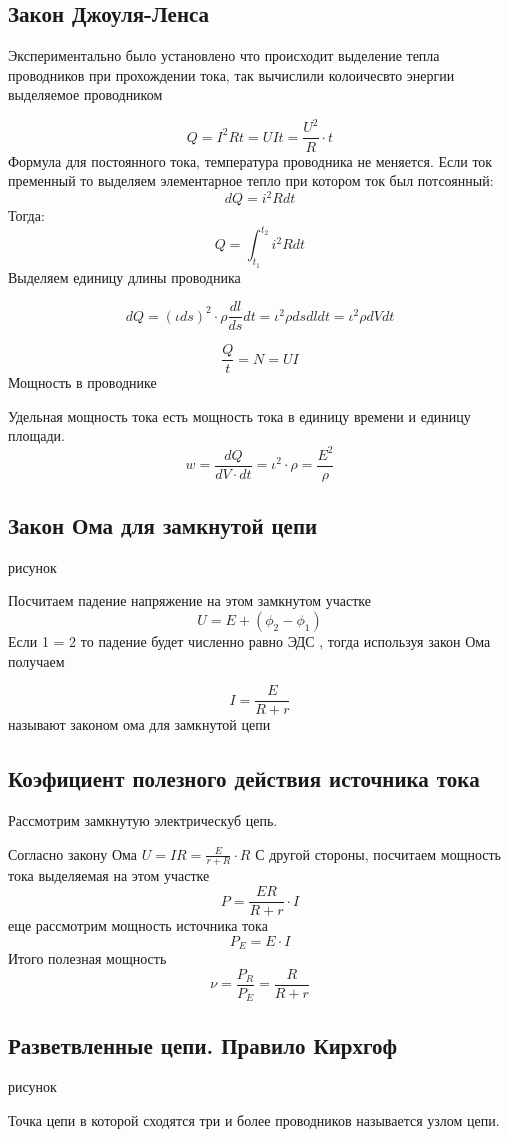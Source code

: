 \documentclass[../main.tex]{subfiles}
\begin{document}
\subsection{Закон Джоуля-Ленса}
Экспериментально было установлено что происходит  выделение тепла проводников при прохождении тока, так вычислили колоичесвто энергии выделяемое проводником

\[ Q = I^2 R t = UIt = \frac{U^2}{R} \cdot t\]
Формула для постоянного тока, температура проводника не меняется. Если ток пременный то выделяем элементарное тепло при котором ток был потсоянный:
\[dQ = i^2 R dt\]
Тогда:
\[Q = \int_{t_1}^{t_2} i^2 R dt\]
Выделяем единицу длины проводника

\[dQ = (\iota ds)^2 \cdot \rho \frac{dl}{ds} dt  = \iota^2 \rho ds dl dt =\iota^2 \rho dV dt \]

\[\frac{Q}{t} = N = UI\]
Мощность в проводнике

Удельная мощность тока есть мощность тока в единицу времени и единицу площади.
\[w = \frac{dQ}{dV \cdot dt} = \iota^2 \cdot \rho = \frac{E^2}{\rho}\]

\subsection{Закон Ома для замкнутой цепи}

рисунок

Посчитаем падение напряжение на этом замкнутом участке
\[U = E + (\phi_2 - \phi_1)\]
Если 1 = 2 то падение будет численно равно ЭДС , тогда используя закон Ома получаем

\[I = \frac{E}{R + r}\]
называют законом ома для замкнутой цепи
\subsection{Коэфициент полезного действия источника тока}
Рассмотрим замкнутую электрическуб цепь.

Согласно закону Ома $U = IR = \frac{E}{r+R} \cdot R$
С другой стороны, посчитаем мощность тока выделяемая на этом участке
\[P = \frac{E R}{R+r} \cdot I\]
еще рассмотрим мощность источника тока
\[P_E = E \cdot I\]
Итого полезная мощность
\[\nu = \frac{P_R}{P_E} = \frac{R}{R+r}\]

\subsection{Разветвленные цепи. Правило Кирхгоф}
рисунок

Точка цепи в которой сходятся три и более проводников называется узлом цепи.
\end{document}
